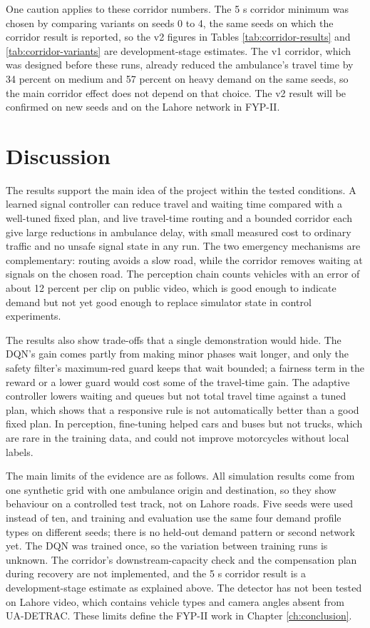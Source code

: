One caution applies to these corridor numbers. The 5 s corridor minimum was chosen by comparing variants on seeds 0 to 4, the same seeds on which the corridor result is reported, so the v2 figures in Tables \ref{tab:corridor-results} and \ref{tab:corridor-variants} are development-stage estimates. The v1 corridor, which was designed before these runs, already reduced the ambulance's travel time by 34 percent on medium and 57 percent on heavy demand on the same seeds, so the main corridor effect does not depend on that choice. The v2 result will be confirmed on new seeds and on the Lahore network in FYP-II.

\section{Discussion}

The results support the main idea of the project within the tested conditions. A learned signal controller can reduce travel and waiting time compared with a well-tuned fixed plan, and live travel-time routing and a bounded corridor each give large reductions in ambulance delay, with small measured cost to ordinary traffic and no unsafe signal state in any run. The two emergency mechanisms are complementary: routing avoids a slow road, while the corridor removes waiting at signals on the chosen road. The perception chain counts vehicles with an error of about 12 percent per clip on public video, which is good enough to indicate demand but not yet good enough to replace simulator state in control experiments.

The results also show trade-offs that a single demonstration would hide. The DQN's gain comes partly from making minor phases wait longer, and only the safety filter's maximum-red guard keeps that wait bounded; a fairness term in the reward or a lower guard would cost some of the travel-time gain. The adaptive controller lowers waiting and queues but not total travel time against a tuned plan, which shows that a responsive rule is not automatically better than a good fixed plan. In perception, fine-tuning helped cars and buses but not trucks, which are rare in the training data, and could not improve motorcycles without local labels.

The main limits of the evidence are as follows. All simulation results come from one synthetic grid with one ambulance origin and destination, so they show behaviour on a controlled test track, not on Lahore roads. Five seeds were used instead of ten, and training and evaluation use the same four demand profile types on different seeds; there is no held-out demand pattern or second network yet. The DQN was trained once, so the variation between training runs is unknown. The corridor's downstream-capacity check and the compensation plan during recovery are not implemented, and the 5 s corridor result is a development-stage estimate as explained above. The detector has not been tested on Lahore video, which contains vehicle types and camera angles absent from UA-DETRAC. These limits define the FYP-II work in Chapter \ref{ch:conclusion}.

